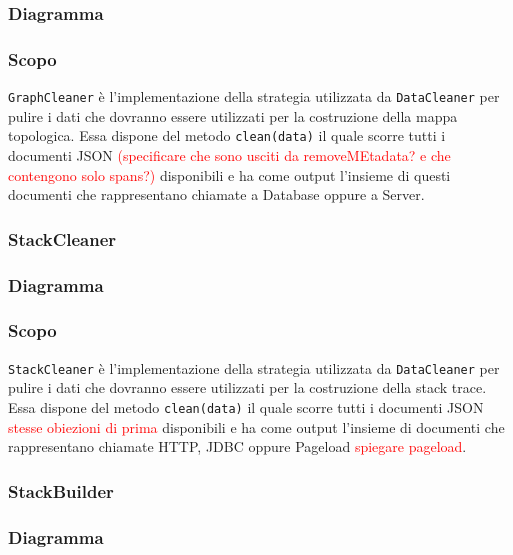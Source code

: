 	\subsubsection{Diagramma}

	\subsubsection{Scopo}
	\texttt{GraphCleaner} è l'implementazione della strategia utilizzata da \texttt{DataCleaner} per pulire i dati che dovranno essere utilizzati per la costruzione della mappa topologica. Essa dispone del metodo \texttt{clean(data)} il quale scorre tutti i documenti JSON \textcolor{red}{(specificare che sono usciti da removeMEtadata? e che contengono solo spans?)} disponibili e ha come output l'insieme di questi documenti che rappresentano chiamate a Database oppure a Server.
	
\subsubsection{StackCleaner}
\label{sec:StackCleaner}
	\subsubsection{Diagramma}
	
	\subsubsection{Scopo}
	\texttt{StackCleaner} è l'implementazione della strategia utilizzata da \texttt{DataCleaner} per pulire i dati che dovranno essere utilizzati per la costruzione della stack trace. Essa dispone del metodo \texttt{clean(data)} il quale scorre tutti i documenti JSON \textcolor{red}{stesse obiezioni di prima} disponibili e ha come output l'insieme di documenti che rappresentano chiamate HTTP, JDBC oppure Pageload \textcolor{red}{spiegare pageload}.
	

\subsubsection{StackBuilder}
\label{sec:StackBuilder}
	\subsubsection{Diagramma}

